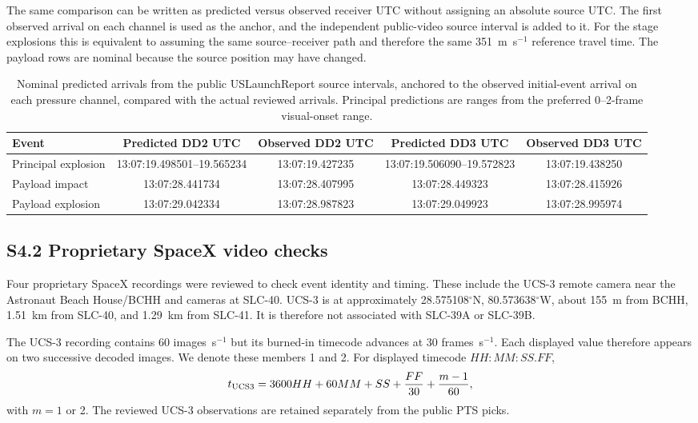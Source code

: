 \documentclass[]{seismica}
\begin{document}
The same comparison can be written as predicted versus observed receiver UTC
without assigning an absolute source UTC. The first observed arrival on each
channel is used as the anchor, and the independent public-video source interval
is added to it. For the stage explosions this is equivalent to assuming the
same source--receiver path and therefore the same 351~m~s$^{-1}$ reference
travel time. The payload rows are nominal because the source position may have
changed.

\begin{table}[!tbp]
\centering
\caption{Nominal predicted arrivals from the public USLaunchReport source
intervals, anchored to the observed initial-event arrival on each pressure
channel, compared with the actual reviewed arrivals. Principal predictions are
ranges from the preferred 0--2-frame visual-onset range.}
\label{tab:supp_predicted_arrivals}
\begin{tabularx}{\textwidth}{Xcccc}
\hline
Event & Predicted DD2 UTC & Observed DD2 UTC & Predicted DD3 UTC & Observed DD3 UTC \\
\hline
Principal explosion & 13:07:19.498501--19.565234 & 13:07:19.427235 & 13:07:19.506090--19.572823 & 13:07:19.438250 \\
Payload impact & 13:07:28.441734 & 13:07:28.407995 & 13:07:28.449323 & 13:07:28.415926 \\
Payload explosion & 13:07:29.042334 & 13:07:28.987823 & 13:07:29.049923 & 13:07:28.995974 \\
\hline
\end{tabularx}
\end{table}

\subsection*{S4.2 Proprietary SpaceX video checks}

Four proprietary SpaceX recordings were reviewed to check event identity and
timing. These include the UCS-3 remote camera near the Astronaut Beach
House/BCHH and cameras at SLC-40. UCS-3 is at approximately
28.575108$^\circ$N, 80.573638$^\circ$W, about 155~m from BCHH, 1.51~km from
SLC-40, and 1.29~km from SLC-41. It is therefore not associated with
SLC-39A or SLC-39B.

The UCS-3 recording contains 60 images~s$^{-1}$ but its burned-in timecode
advances at 30 frames~s$^{-1}$. Each displayed value therefore appears on two
successive decoded images. We denote these members 1 and 2. For displayed
timecode $HH{:}MM{:}SS.FF$,
\begin{equation}
 t_{\rm UCS3}=3600HH+60MM+SS+\frac{FF}{30}+\frac{m-1}{60},
\end{equation}
with $m=1$ or 2. The reviewed UCS-3 observations are retained separately from
the public PTS picks.
\end{document}
